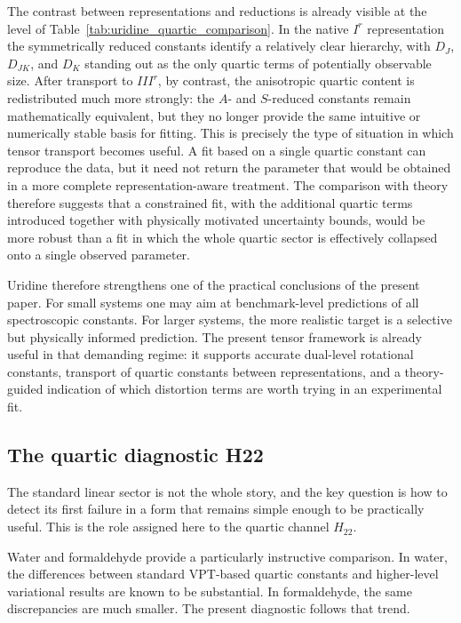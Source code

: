 \documentclass[aip,jcp,reprint,floatfix]{revtex4-2}
\begin{document}
The contrast between representations and reductions is already visible at the
level of Table~\ref{tab:uridine_quartic_comparison}. In the native $I^r$
representation the symmetrically reduced constants identify a relatively clear
hierarchy, with $D_J$, $D_{JK}$, and $D_K$ standing out as the only quartic
terms of potentially observable size. After transport to $III^r$, by
contrast, the anisotropic quartic content is redistributed much more strongly:
the $A$- and $S$-reduced constants remain mathematically equivalent, but they
no longer provide the same intuitive or numerically stable basis for fitting.
This is precisely the type of situation in which tensor transport becomes
useful. A fit based on a single quartic constant can reproduce the data, but
it need not return the parameter that would be obtained in a more complete
representation-aware treatment. The comparison with theory therefore suggests
that a constrained fit, with the additional quartic terms introduced together
with physically motivated uncertainty bounds, would be more robust than a fit
in which the whole quartic sector is effectively collapsed onto a single
observed parameter.

Uridine therefore strengthens one of the practical conclusions of the present
paper. For small systems one may aim at benchmark-level predictions of all
spectroscopic constants. For larger systems, the more realistic target is a
selective but physically informed prediction. The present tensor framework is
already useful in that demanding regime: it supports accurate dual-level
rotational constants, transport of quartic constants between representations,
and a theory-guided indication of which distortion terms are worth trying in
an experimental fit.

\subsection{The quartic diagnostic H22}

The standard linear sector is not the whole story, and the key question is how
to detect its first failure in a form that remains simple enough to be
practically useful. This is the role assigned here to the quartic channel
$H_{22}$.

Water and formaldehyde provide a particularly instructive comparison. In
water, the differences between standard VPT-based quartic constants and
higher-level variational results are known to be substantial. In
formaldehyde, the same discrepancies are much smaller. The present diagnostic
follows that trend.
\end{document}
